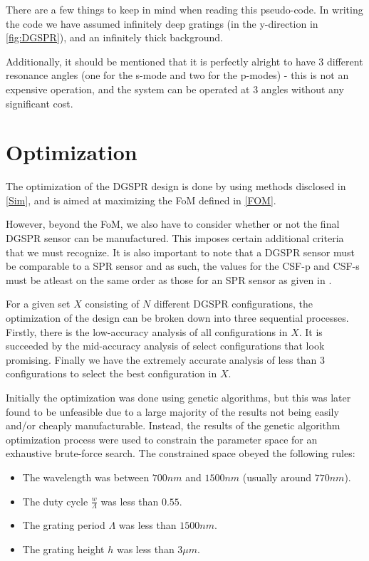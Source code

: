 There are a few things to keep in mind when reading this pseudo-code. In writing the code we have assumed infinitely deep gratings (in the y-direction in \autoref{fig:DGSPR}), and an infinitely thick background. 

Additionally, it should be mentioned that it is perfectly alright to have 3 different resonance angles (one for the s-mode and two for the p-modes) - this is not an expensive operation, and the system can be operated at 3 angles without any significant cost.

\section{Optimization}

The optimization of the DGSPR design is done by using methods disclosed in \autoref{Sim}, and is aimed at maximizing the FoM defined in \autoref{FOM}.

However, beyond the FoM, we also have to consider whether or not the final DGSPR sensor can be manufactured. This imposes certain additional criteria that we must recognize. It is also important to note that a DGSPR sensor must be comparable to a SPR sensor and as such, the values for the CSF-p and CSF-s must be atleast on the same order as those for an SPR sensor as given in \cite{farshid_ol}.

For a given set $X$ consisting of $N$ different DGSPR configurations, the optimization of the design can be broken down into three sequential processes. Firstly, there is the low-accuracy analysis of all configurations in $X$. It is succeeded by the mid-accuracy analysis of select configurations that look promising. Finally we have the extremely accurate analysis of less than 3 configurations to select the best configuration in $X$.

Initially the optimization was done using genetic algorithms, but this was later found to be unfeasible due to a large majority of the results not being easily and/or cheaply manufacturable. Instead, the results of the genetic algorithm optimization process were used to constrain the parameter space for an exhaustive brute-force search. The constrained space obeyed the following rules:

\begin{itemize}
\item The wavelength was between $700 nm$ and $1500 nm$ (usually around $770 nm$).\\
\item The duty cycle $\frac{w}{\Lambda}$ was less than $0.55$. \\
\item The grating period $\Lambda$ was less than $1500 nm$. \\
\item The grating height $h$ was less than $3 \mu m$. 
\end{itemize}

